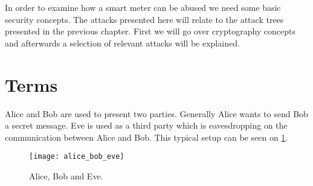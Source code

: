 
In order to examine how a smart meter can be abused we need some basic security concepts.
The attacks presented here will relate to the attack trees presented in the previous chapter.
First we will go over cryptography concepts and afterwards a selection of relevant attacks will be explained.

\section{Terms}
Alice and Bob are used to present two parties.
Generally Alice wants to send Bob a secret message.
Eve is used as a third party which is eavesdropping on the communication between Alice and Bob.
This typical setup can be seen on \cref{alice_bob_eve}.

\begin{figure}[H]
  \begin{center}
    \texttt{[image: alice\_bob\_eve]}
  \end{center}
  \caption[wat]{Alice, Bob and Eve.\footnotemark}
  \label{alice_bob_eve}
\end{figure}
